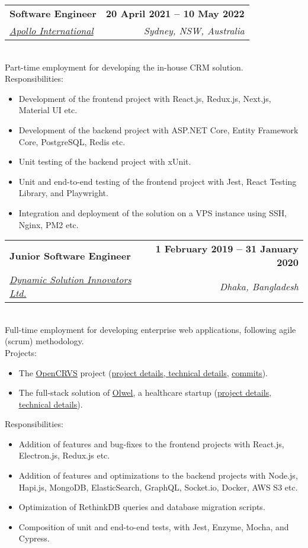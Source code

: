 \documentclass[12pt,a4paper]{article}
\makeatletter
\newcommand{\resumeItem}[1]{
  \item{
    {#1 \vspace{-2pt}}
  }
}
\newcommand{\resumeSubheading}[4]{
  \vspace{-2pt}\item
    \begin{tabular*}{1.0\textwidth}[t]{l@{\extracolsep{\fill}}r}
      \textbf{#1} & \textbf{\small #2} \\
      \textit{\small#3} & \textit{\small #4} \\
    \end{tabular*}\vspace{-7pt}
}
\newcommand{\resumeItemListStart}{\begin{itemize}}
\newcommand{\resumeItemListEnd}{\end{itemize}\vspace{-5pt}}
\makeatother
\begin{document}
    \resumeSubheading
      {Software Engineer}{20 April 2021 -- 10 May 2022}
      {\href{https://www.apollointl.com.au}{Apollo International}}{Sydney, NSW, Australia}
      \\ \vspace{8pt} Part-time employment for developing the in-house CRM solution. \vspace{-4pt}
      \\ \vspace{6pt} Responsibilities: \vspace{-4pt}
      \resumeItemListStart
        \resumeItem{Development of the frontend project with React.js, Redux.js,  Next.js, Material UI etc.}
        \resumeItem{Development of the backend project with ASP.NET Core, Entity Framework Core, PostgreSQL, Redis etc.}
        \resumeItem{Unit testing of the backend project with xUnit.}
        \resumeItem{Unit and end-to-end testing of the frontend project with Jest, React Testing Library, and Playwright.}
        \resumeItem{Integration and deployment of the solution on a VPS instance using SSH, Nginx, PM2 etc.}
      \resumeItemListEnd

    \resumeSubheading
      {Junior Software Engineer}{1 February 2019 -- 31 January 2020}
      {\href{https://www.dsinnovators.com}{Dynamic Solution Innovators Ltd.}}{Dhaka, Bangladesh}
      \\ \vspace{8pt} Full-time employment for developing enterprise web applications, following agile (scrum) methodology. \vspace{-4pt}
      \\ \vspace{6pt} Projects: \vspace{-4pt}
      \resumeItemListStart
      \resumeItem{The \href{https://www.opencrvs.org}{\underline{OpenCRVS}} project (\href{https://www.dsinnovators.com/casestudies/open-crvs-2}{\href{https://www.dsinnovators.com/projects/open-crvs}{\underline{project details}}, \underline{technical details}}, \href{https://github.com/opencrvs/opencrvs-core/commits?author=maacpiash}{\underline{commits}}).}
      \resumeItem{The full-stack solution of \href{https://www.olwel.com}{\underline{Olwel}}, a healthcare startup (\href{https://www.dsinnovators.com/projects/olwel}{\underline{project details}}, \href{https://www.dsinnovators.com/casestudies/olwel-2}{\underline{technical details}}).}
      \resumeItemListEnd
      \vspace{1pt} Responsibilities: \vspace{-4pt}
      \resumeItemListStart
        \resumeItem{Addition of features and bug-fixes to the frontend projects with React.js, Electron.js, Redux.js etc.}
        \resumeItem{Addition of features and optimizations to the backend projects with Node.js, Hapi.js, MongoDB, ElasticSearch, GraphQL, Socket.io, Docker, AWS S3 etc.}
        \resumeItem{Optimization of RethinkDB queries and database migration scripts.}
        \resumeItem{Composition of unit and end-to-end tests, with Jest, Enzyme, Mocha, and Cypress.}
    \resumeItemListEnd
\end{document}
